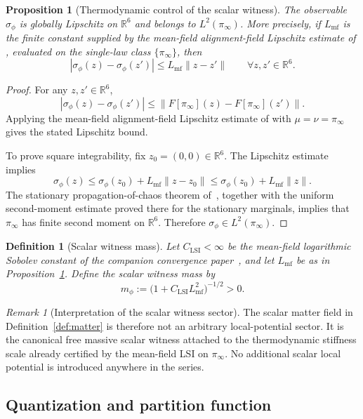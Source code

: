\documentclass[11pt]{article}
\newtheorem{definition}[theorem]{Definition}
\newtheorem{proposition}[theorem]{Proposition}
\theoremstyle{remark}
\newtheorem{remark}[theorem]{Remark}
\newcommand{\R}{\mathbb R}
\begin{document}
\begin{proposition}[Thermodynamic control of the scalar witness]
\label{prop:scalar-witness}
The observable $\sigma_\phi$ is globally Lipschitz on $\R^6$ and belongs to
$L^2(\pi_\infty)$.  More precisely, if $L_{\mathrm{mf}}$ is the finite constant
supplied by the mean-field alignment-field Lipschitz estimate of
\cite{convergence}, evaluated on the
single-law class $\{\pi_\infty\}$, then
\[
|\sigma_\phi(z)-\sigma_\phi(z')|
\le
L_{\mathrm{mf}}\|z-z'\|
\qquad
\forall z,z'\in\R^6.
\]
\end{proposition}
\begin{proof}
For any $z,z'\in\R^6$,
\[
|\sigma_\phi(z)-\sigma_\phi(z')|
\le
\|F[\pi_\infty](z)-F[\pi_\infty](z')\|.
\]
Applying the mean-field alignment-field Lipschitz estimate of \cite{convergence} with
$\mu=\nu=\pi_\infty$ gives the stated Lipschitz bound.

To prove square integrability, fix $z_0=(0,0)\in\R^6$.  The Lipschitz estimate
implies
\[
\sigma_\phi(z)\le \sigma_\phi(z_0)+L_{\mathrm{mf}}\|z-z_0\|
\le
\sigma_\phi(z_0)+L_{\mathrm{mf}}\|z\|.
\]
The stationary propagation-of-chaos theorem of~\cite{convergence}, together
with the uniform second-moment estimate proved there for the stationary
marginals, implies that $\pi_\infty$ has finite second moment on $\R^6$.
Therefore $\sigma_\phi\in L^2(\pi_\infty)$.
\end{proof}

\begin{definition}[Scalar witness mass]
\label{def:scalar-mass}
Let $C_{\mathrm{LSI}}<\infty$ be the mean-field logarithmic Sobolev constant of
the companion convergence paper~\cite{convergence},
and let $L_{\mathrm{mf}}$ be as in Proposition~\ref{prop:scalar-witness}.
Define the scalar witness mass by
\[
m_\phi:=\bigl(1+C_{\mathrm{LSI}}L_{\mathrm{mf}}^2\bigr)^{-1/2}>0.
\]
\end{definition}

\begin{remark}[Interpretation of the scalar witness sector]
\label{rem:scalar-witness}
The scalar matter field in Definition~\ref{def:matter} is therefore not an
arbitrary local-potential sector.  It is the canonical free massive scalar
witness attached to the thermodynamic stiffness scale already certified by the
mean-field LSI on $\pi_\infty$.  No additional scalar local potential is
introduced anywhere in the series.
\end{remark}

\subsection{Quantization and partition function}
\end{document}
